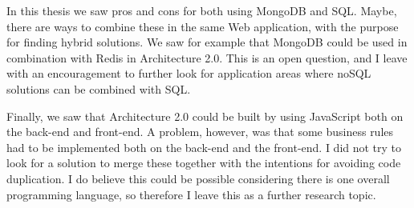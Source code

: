 In this thesis we saw pros and cons for both using MongoDB and SQL. Maybe, there are ways to combine these in the same Web application, with the purpose for finding hybrid solutions. We saw for example that MongoDB could be used in combination with Redis in Architecture 2.0. This is an open question, and I leave with an encouragement to further look for application areas where noSQL solutions can be combined with SQL. 

Finally, we saw that Architecture 2.0 could be built by using JavaScript both on the back-end and front-end. A problem, however, was that some business rules had to be implemented both on the back-end and the front-end. I did not try to look for a solution to merge these together with the intentions for avoiding code duplication. I do believe this could be possible considering there is one overall programming language, so therefore I leave this as a further research topic. 

